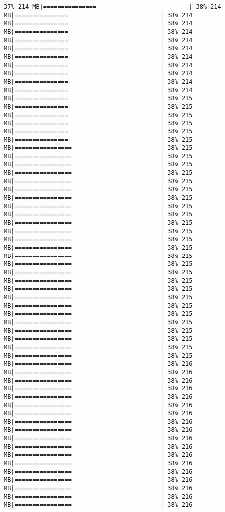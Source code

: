 \documentclass[
]{article}
\begin{document}
\begin{verbatim}
37% 214 MB|===============                          | 38% 214 MB|===============                          | 38% 214 MB|===============                          | 38% 214 MB|===============                          | 38% 214 MB|===============                          | 38% 214 MB|===============                          | 38% 214 MB|===============                          | 38% 214 MB|===============                          | 38% 214 MB|===============                          | 38% 214 MB|===============                          | 38% 214 MB|===============                          | 38% 214 MB|===============                          | 38% 215 MB|===============                          | 38% 215 MB|===============                          | 38% 215 MB|===============                          | 38% 215 MB|===============                          | 38% 215 MB|===============                          | 38% 215 MB|================                         | 38% 215 MB|================                         | 38% 215 MB|================                         | 38% 215 MB|================                         | 38% 215 MB|================                         | 38% 215 MB|================                         | 38% 215 MB|================                         | 38% 215 MB|================                         | 38% 215 MB|================                         | 38% 215 MB|================                         | 38% 215 MB|================                         | 38% 215 MB|================                         | 38% 215 MB|================                         | 38% 215 MB|================                         | 38% 215 MB|================                         | 38% 215 MB|================                         | 38% 215 MB|================                         | 38% 215 MB|================                         | 38% 215 MB|================                         | 38% 215 MB|================                         | 38% 215 MB|================                         | 38% 215 MB|================                         | 38% 215 MB|================                         | 38% 215 MB|================                         | 38% 215 MB|================                         | 38% 215 MB|================                         | 38% 215 MB|================                         | 38% 216 MB|================                         | 38% 216 MB|================                         | 38% 216 MB|================                         | 38% 216 MB|================                         | 38% 216 MB|================                         | 38% 216 MB|================                         | 38% 216 MB|================                         | 38% 216 MB|================                         | 38% 216 MB|================                         | 38% 216 MB|================                         | 38% 216 MB|================                         | 38% 216 MB|================                         | 38% 216 MB|================                         | 38% 216 MB|================                         | 38% 216 MB|================                         | 38% 216 MB|================                         | 38% 216 MB|================                         | 38% 216 
\end{verbatim}
\end{document}
